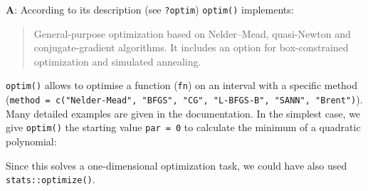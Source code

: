 \documentclass[
]{krantz}
\makeatletter
\newenvironment{Shaded}{\begin{snugshade}}{\end{snugshade}}
\newcommand{\CommentTok}[1]{\textcolor[rgb]{0.56,0.35,0.01}{\textit{#1}}}
\newcommand{\ControlFlowTok}[1]{\textcolor[rgb]{0.13,0.29,0.53}{\textbf{#1}}}
\newcommand{\DataTypeTok}[1]{\textcolor[rgb]{0.13,0.29,0.53}{#1}}
\newcommand{\DecValTok}[1]{\textcolor[rgb]{0.00,0.00,0.81}{#1}}
\newcommand{\FloatTok}[1]{\textcolor[rgb]{0.00,0.00,0.81}{#1}}
\newcommand{\KeywordTok}[1]{\textcolor[rgb]{0.13,0.29,0.53}{\textbf{#1}}}
\newcommand{\NormalTok}[1]{#1}
\newcommand{\OperatorTok}[1]{\textcolor[rgb]{0.81,0.36,0.00}{\textbf{#1}}}
\newcommand{\StringTok}[1]{\textcolor[rgb]{0.31,0.60,0.02}{#1}}
\newenvironment{kframe}{%
\medskip{}
\setlength{\fboxsep}{.8em}
 \def\at@end@of@kframe{}%
 \ifinner\ifhmode%
  \def\at@end@of@kframe{\end{minipage}}%
  \begin{minipage}{\columnwidth}%
 \fi\fi%
 \def\FrameCommand##1{\hskip\@totalleftmargin \hskip-\fboxsep
 \colorbox{shadecolor}{##1}\hskip-\fboxsep
     \hskip-\linewidth \hskip-\@totalleftmargin \hskip\columnwidth}%
 \MakeFramed {\advance\hsize-\width
   \@totalleftmargin\z@ \linewidth\hsize
   \@setminipage}}%
 {\par\unskip\endMakeFramed%
 \at@end@of@kframe}
\renewenvironment{Shaded}{\begin{kframe}}{\end{kframe}}
\renewcommand{\KeywordTok} [1]{\textcolor[rgb]{0.00,0.44,0.13}{{#1}}}
\renewcommand{\DataTypeTok}[1]{\textcolor[rgb]{0.56,0.13,0.00}{{#1}}}
\renewcommand{\DecValTok}  [1]{\textcolor[rgb]{0.25,0.63,0.44}{{#1}}}
\renewcommand{\FloatTok}   [1]{\textcolor[rgb]{0.25,0.63,0.44}{{#1}}}
\renewcommand{\StringTok}  [1]{\textcolor[rgb]{0.25,0.44,0.63}{{#1}}}
\renewcommand{\CommentTok} [1]{\textcolor[rgb]{0.38,0.63,0.69}{{#1}}}
\renewcommand{\NormalTok}  [1]{{#1}}
\makeatother
\begin{document}
\textbf{{A}}: According to its description (see \texttt{?optim}) \texttt{optim()} implements:

\begin{quote}
General-purpose optimization based on Nelder--Mead, quasi-Newton and conjugate-gradient algorithms. It includes an option for box-constrained optimization and simulated annealing.
\end{quote}

\texttt{optim()} allows to optimise a function (\texttt{fn}) on an interval with a specific method (\texttt{method\ =\ c("Nelder-Mead",\ "BFGS",\ "CG",\ "L-BFGS-B",\ "SANN",\ "Brent")}). Many detailed examples are given in the documentation. In the simplest case, we give \texttt{optim()} the starting value \texttt{par\ =\ 0} to calculate the minimum of a quadratic polynomial:

\begin{Shaded}
\end{Shaded}

Since this solves a one-dimensional optimization task, we could have also used \texttt{stats::optimize()}.

\begin{Shaded}
\end{Shaded}
\end{document}
